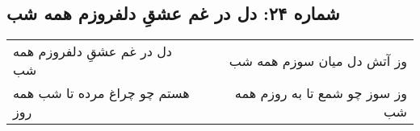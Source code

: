 \begin{center}
\section*{شماره ۲۴: دل در غم عشقِ دلفروزم همه شب}
\label{sec:024}
\begin{longtable}{l p{0.5cm} r}
دل در غم عشقِ دلفروزم همه شب
&&
وز آتش دل میان سوزم همه شب
\\
هستم چو چراغ مرده تا شب همه روز
&&
وز سوز چو شمع تا به روزم همه شب
\\
\end{longtable}
\end{center}

